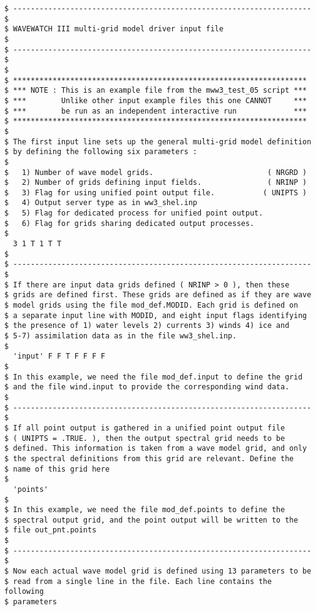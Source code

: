 \begin{footnotesize}
\begin{verbatim}
$ -------------------------------------------------------------------- $
$ WAVEWATCH III multi-grid model driver input file                     $
$ -------------------------------------------------------------------- $
$
$ *******************************************************************
$ *** NOTE : This is an example file from the mww3_test_05 script ***
$ ***        Unlike other input example files this one CANNOT     ***
$ ***        be run as an independent interactive run             ***
$ *******************************************************************
$
$ The first input line sets up the general multi-grid model definition
$ by defining the following six parameters :
$
$   1) Number of wave model grids.                          ( NRGRD )
$   2) Number of grids defining input fields.               ( NRINP )
$   3) Flag for using unified point output file.           ( UNIPTS )
$   4) Output server type as in ww3_shel.inp
$   5) Flag for dedicated process for unified point output.
$   6) Flag for grids sharing dedicated output processes.
$
  3 1 T 1 T T
$
$ -------------------------------------------------------------------- $
$ If there are input data grids defined ( NRINP > 0 ), then these
$ grids are defined first. These grids are defined as if they are wave
$ model grids using the file mod_def.MODID. Each grid is defined on
$ a separate input line with MODID, and eight input flags identifying
$ the presence of 1) water levels 2) currents 3) winds 4) ice and
$ 5-7) assimilation data as in the file ww3_shel.inp.
$
  'input' F F T F F F F
$
$ In this example, we need the file mod_def.input to define the grid
$ and the file wind.input to provide the corresponding wind data.
$
$ -------------------------------------------------------------------- $
$ If all point output is gathered in a unified point output file
$ ( UNIPTS = .TRUE. ), then the output spectral grid needs to be 
$ defined. This information is taken from a wave model grid, and only
$ the spectral definitions from this grid are relevant. Define the
$ name of this grid here
$
  'points'
$
$ In this example, we need the file mod_def.points to define the
$ spectral output grid, and the point output will be written to the
$ file out_pnt.points
$
$ -------------------------------------------------------------------- $
$ Now each actual wave model grid is defined using 13 parameters to be
$ read from a single line in the file. Each line contains the following
$ parameters

\end{verbatim}
\end{footnotesize}
